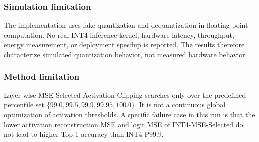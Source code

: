 \subsubsection{Simulation limitation}
The implementation uses fake quantization and dequantization in floating-point computation. No real INT4 inference kernel, hardware latency, throughput, energy measurement, or deployment speedup is reported. The results therefore characterize simulated quantization behavior, not measured hardware behavior.

\subsubsection{Method limitation}
Layer-wise MSE-Selected Activation Clipping searches only over the predefined percentile set \(\{99.0,99.5,99.9,99.95,100.0\}\). It is not a continuous global optimization of activation thresholds. A specific failure case in this run is that the lower activation reconstruction MSE and logit MSE of INT4-MSE-Selected do not lead to higher Top-1 accuracy than INT4-P99.9.
